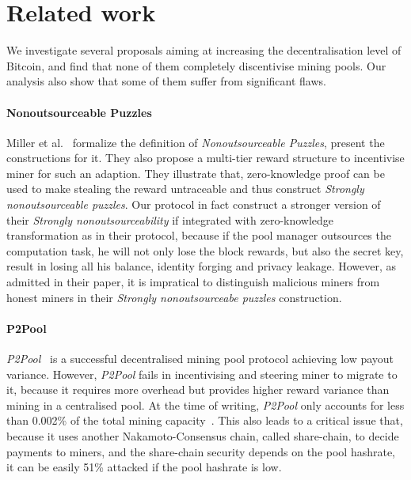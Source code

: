 \section{Related work}

We investigate several proposals aiming at increasing the decentralisation level of Bitcoin, and find that none of them completely discentivise mining pools.
Our analysis also show that some of them suffer from significant flaws.

\paragraph{\textbf{Nonoutsourceable Puzzles}}
Miller et al.~\cite{miller2015nonoutsourceable} formalize the definition of \textit{Nonoutsourceable Puzzles},
present the constructions for it.
They also propose a multi-tier reward structure to incentivise miner for such an adaption.  
They illustrate that, zero-knowledge proof can be used to make stealing the reward untraceable and thus construct \textit{Strongly nonoutsourceable puzzles}.
Our protocol in fact construct a stronger version of their \textit{Strongly nonoutsourceability} if integrated with zero-knowledge transformation as in their protocol, because if the pool manager outsources the computation task, he will not only lose the block rewards, but also the secret key, result in losing all his balance, identity forging and privacy leakage.
However, as admitted in their paper, it is impratical to distinguish malicious miners from honest miners in their \textit{Strongly nonoutsourceabe puzzles} construction.


\paragraph{\textbf{P2Pool}}
\textit{P2Pool}~\cite{p2pool} is a successful decentralised mining pool protocol achieving low payout variance.
However, \textit{P2Pool} fails in incentivising and steering miner to migrate to it, because it requires more overhead but provides higher reward variance than mining in a centralised pool.
At the time of writing, \textit{P2Pool} only accounts for less than 0.002\% of the total mining capacity~\cite{p2pool-stats}.
This also leads to a critical issue that, because it uses another Nakamoto-Consensus chain, called share-chain, to decide payments to miners, and the share-chain security depends on the pool hashrate, it can be easily 51\% attacked if the pool hashrate is low.


